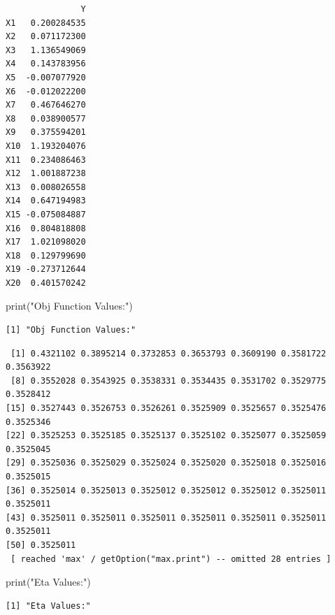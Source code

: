 \documentclass[
  letterpaper,
  DIV=11,
  numbers=noendperiod]{scrartcl}
\newenvironment{Shaded}{\begin{snugshade}}{\end{snugshade}}
\newcommand{\FunctionTok}[1]{\textcolor[rgb]{0.28,0.35,0.67}{#1}}
\newcommand{\NormalTok}[1]{\textcolor[rgb]{0.00,0.23,0.31}{#1}}
\newcommand{\SpecialCharTok}[1]{\textcolor[rgb]{0.37,0.37,0.37}{#1}}
\newcommand{\StringTok}[1]{\textcolor[rgb]{0.13,0.47,0.30}{#1}}
\begin{document}
\begin{verbatim}
               Y
X1   0.200284535
X2   0.071172300
X3   1.136549069
X4   0.143783956
X5  -0.007077920
X6  -0.012022200
X7   0.467646270
X8   0.038900577
X9   0.375594201
X10  1.193204076
X11  0.234086463
X12  1.001887238
X13  0.008026558
X14  0.647194983
X15 -0.075084887
X16  0.804818808
X17  1.021098020
X18  0.129799690
X19 -0.273712644
X20  0.401570242
\end{verbatim}

\begin{Shaded}
\begin{Highlighting}[]
\FunctionTok{print}\NormalTok{(}\StringTok{"Obj Function Values:"}\NormalTok{)}
\end{Highlighting}
\end{Shaded}

\begin{verbatim}
[1] "Obj Function Values:"
\end{verbatim}

\begin{Shaded}
\end{Shaded}

\begin{verbatim}
 [1] 0.4321102 0.3895214 0.3732853 0.3653793 0.3609190 0.3581722 0.3563922
 [8] 0.3552028 0.3543925 0.3538331 0.3534435 0.3531702 0.3529775 0.3528412
[15] 0.3527443 0.3526753 0.3526261 0.3525909 0.3525657 0.3525476 0.3525346
[22] 0.3525253 0.3525185 0.3525137 0.3525102 0.3525077 0.3525059 0.3525045
[29] 0.3525036 0.3525029 0.3525024 0.3525020 0.3525018 0.3525016 0.3525015
[36] 0.3525014 0.3525013 0.3525012 0.3525012 0.3525012 0.3525011 0.3525011
[43] 0.3525011 0.3525011 0.3525011 0.3525011 0.3525011 0.3525011 0.3525011
[50] 0.3525011
 [ reached 'max' / getOption("max.print") -- omitted 28 entries ]
\end{verbatim}

\begin{Shaded}
\begin{Highlighting}[]
\FunctionTok{print}\NormalTok{(}\StringTok{"Eta Values:"}\NormalTok{)}
\end{Highlighting}
\end{Shaded}

\begin{verbatim}
[1] "Eta Values:"
\end{verbatim}
\end{document}
